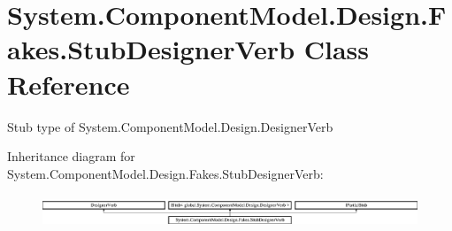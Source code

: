 \hypertarget{class_system_1_1_component_model_1_1_design_1_1_fakes_1_1_stub_designer_verb}{\section{System.\-Component\-Model.\-Design.\-Fakes.\-Stub\-Designer\-Verb Class Reference}
\label{class_system_1_1_component_model_1_1_design_1_1_fakes_1_1_stub_designer_verb}
}


Stub type of System.\-Component\-Model.\-Design.\-Designer\-Verb 


Inheritance diagram for System.\-Component\-Model.\-Design.\-Fakes.\-Stub\-Designer\-Verb\-:\begin{figure}[H]
\begin{center}
\leavevmode
\includegraphics[height=0.987654cm]{class_system_1_1_component_model_1_1_design_1_1_fakes_1_1_stub_designer_verb}
\end{center}
\end{figure}
